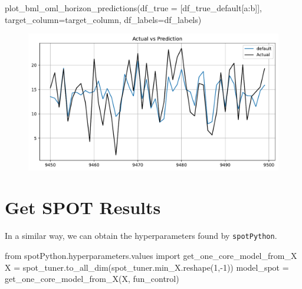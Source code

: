 \documentclass[
  letterpaper,
  DIV=11,
  numbers=noendperiod]{scrreprt}
\newenvironment{Shaded}{\begin{snugshade}}{\end{snugshade}}
\newcommand{\DecValTok}[1]{\textcolor[rgb]{0.68,0.00,0.00}{#1}}
\newcommand{\ImportTok}[1]{\textcolor[rgb]{0.00,0.46,0.62}{#1}}
\newcommand{\NormalTok}[1]{\textcolor[rgb]{0.00,0.23,0.31}{#1}}
\newcommand{\OperatorTok}[1]{\textcolor[rgb]{0.37,0.37,0.37}{#1}}
\begin{document}
\begin{Shaded}
\begin{Highlighting}[]
\NormalTok{plot\_bml\_oml\_horizon\_predictions(df\_true }\OperatorTok{=}\NormalTok{ [df\_true\_default[a:b]], target\_column}\OperatorTok{=}\NormalTok{target\_column,  df\_labels}\OperatorTok{=}\NormalTok{df\_labels)}
\end{Highlighting}
\end{Shaded}

\begin{figure}[H]

{\centering \includegraphics{025_spot_hpt_river_friedman_amfr_files/figure-pdf/cell-31-output-1.pdf}

}

\end{figure}

\hypertarget{get-spot-results-6}{%
\section{Get SPOT Results}\label{get-spot-results-6}}

In a similar way, we can obtain the hyperparameters found by
\texttt{spotPython}.

\begin{Shaded}
\begin{Highlighting}[]
\ImportTok{from}\NormalTok{ spotPython.hyperparameters.values }\ImportTok{import}\NormalTok{ get\_one\_core\_model\_from\_X}
\NormalTok{X }\OperatorTok{=}\NormalTok{ spot\_tuner.to\_all\_dim(spot\_tuner.min\_X.reshape(}\DecValTok{1}\NormalTok{,}\OperatorTok{{-}}\DecValTok{1}\NormalTok{))}
\NormalTok{model\_spot }\OperatorTok{=}\NormalTok{ get\_one\_core\_model\_from\_X(X, fun\_control)}
\end{Highlighting}
\end{Shaded}
\end{document}
